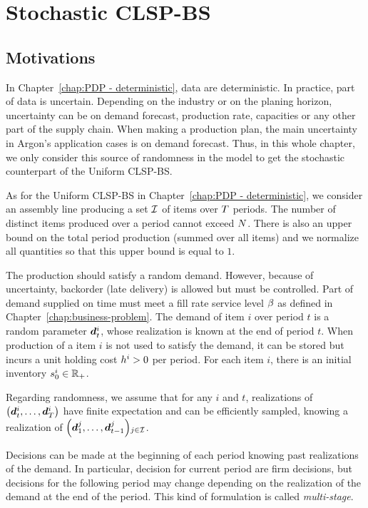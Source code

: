 \chapter{Stochastic CLSP-BS}
\label{chap:PDP:stochastic}

\section{Motivations}


In Chapter~\ref{chap:PDP - deterministic}, data are deterministic. In practice, part of data is uncertain. Depending on the industry or on the planing horizon, uncertainty can be on demand forecast, production rate, capacities or any other part of the supply chain. When making a production plan, the main uncertainty in Argon's application cases is on demand forecast. Thus, in this whole chapter, we only consider this source of randomness in the model to get the stochastic counterpart of the Uniform CLSP-BS.


As for the Uniform CLSP-BS in Chapter~\ref{chap:PDP - deterministic}, we consider an assembly line producing a set $\mathcal{I}$ of items over $T$ periods. The number of distinct items produced over a period cannot exceed $N$. There is also an upper bound on the total period production (summed over all items) and we normalize all quantities so that this upper bound is equal to $1$.

The production should satisfy a random demand. However, because of uncertainty, backorder (\ie late delivery) is allowed but must be controlled. Part of demand supplied on time must meet a fill rate service level $\beta$ as defined in Chapter~\ref{chap:business-problem}. The demand of item $i$ over period $t$ is a random parameter $\va\demand_t^i$, whose realization is known at the end of period $t$. When production of a item $i$ is not used to satisfy the demand, it can be stored but incurs a unit holding cost $h^i>0$ per period. For each item $i$, there is an initial inventory $s_0^i\in\mathbb{R}_+$.

Regarding randomness, we assume that for any $i$ and $t$, realizations of $\bracket{\va\demand_t^i,\ldots,\va\demand_{\horizon}^i}$ have finite expectation and can be efficiently sampled, knowing a realization of $\bracket{\va\demand_1^j,\ldots,\va\demand_{t-1}^j}_{j\in\REF}$.

Decisions can be made at the beginning of each period knowing past realizations of the demand. In particular, decision for current period are firm decisions, but decisions for the following period may change depending on the realization of the demand at the end of the period. This kind of formulation is called \emph{multi-stage}.

